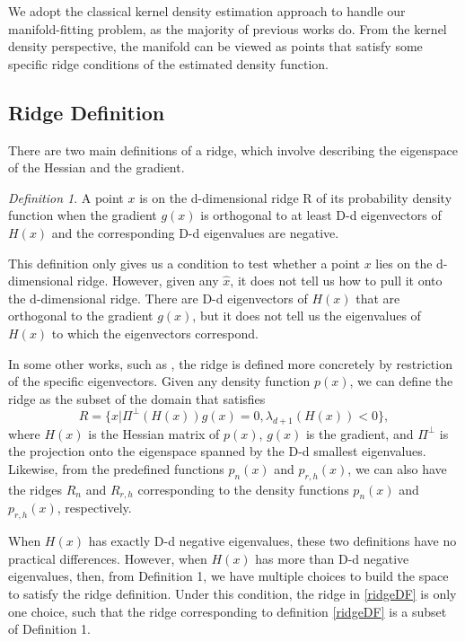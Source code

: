 \documentclass[aos,preprint]{imsart}
\theoremstyle{remark}
\newtheorem{definition}[theorem]{Definition}
\begin{document}
We adopt the classical kernel density estimation approach to handle our manifold-fitting problem, as the majority of previous works do. From the kernel density perspective, the manifold can be viewed as points that satisfy some specific ridge conditions of the estimated density function.
\subsection{Ridge Definition}
There are two main definitions of a ridge, which involve describing the eigenspace of the Hessian and the gradient.
\begin{definition}
A point $x$ is on the d-dimensional ridge R of its probability density function when the gradient $g(x)$ is orthogonal to at least D-d eigenvectors of $H(x)$ and the corresponding D-d eigenvalues are negative. \cite{ozertem2011locally}
\end{definition}
This definition only gives us a condition to test whether a point $x$ lies on the d-dimensional ridge. However, given any $\hat{x}$, it does not tell us how to pull it onto the d-dimensional ridge. There are D-d eigenvectors of $H(x)$ that are orthogonal to the gradient $g(x)$, but it does not tell us the eigenvalues of $H(x)$ to which the eigenvectors correspond.

In some other works, such as \cite{genovese2014nonparametric}, the ridge is defined more concretely by restriction of the specific eigenvectors. Given any density function $p(x)$, we can define the ridge as the subset of the domain that satisfies
\begin{equation}\label{ridgeDF}
R = \{x| \Pi^{\perp}(H(x)) g(x) = 0, \lambda_{d+1}(H(x))<0\},
\end{equation}
where $H(x)$ is the Hessian matrix of $p(x)$, $g(x)$ is the gradient, and $\Pi^{\perp}$ is the projection onto the eigenspace spanned by the D-d smallest eigenvalues. Likewise, from the predefined functions $p_n(x)$ and $p_{r, h}(x)$, we can also have the ridges $R_n$ and $R_{r, h}$ corresponding to the density functions $p_n(x)$ and $p_{r,h}(x)$, respectively.

When $H(x)$ has exactly D-d negative eigenvalues, these two definitions have no practical differences. However, when $H(x)$ has more than D-d negative eigenvalues, then, from Definition 1, we have multiple choices to build the space to satisfy the ridge definition. Under this condition, the ridge in \eqref{ridgeDF} is only one choice, such that the ridge corresponding to definition \eqref{ridgeDF} is a subset of Definition 1.
\end{document}
